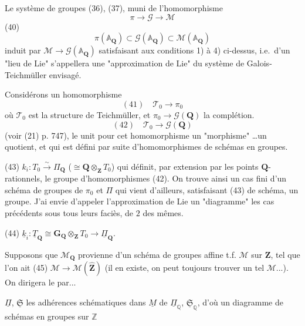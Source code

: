 \newpage


Le système de groupes (36), (37), muni de l'homomorphisme
$$
\pi \to \mathcal{G} \to \mathcal{M}
$$
(40) $$
\pi(\mathbb{A}_{\mathbf{Q}}) \subset \mathcal{G}(\mathbb{A}_{\mathbf{Q}}) \subset \mathcal{M}(\mathbb{A}_{\mathbf{Q}})
$$
induit par $\mathcal{M} \to \mathcal{G}(\mathbb{A}_{\mathbf{Q}})$ satisfaisant aux conditions 1) à 4) ci-dessus, i.e.\ d'un "lieu de Lie" s'appellera une "approximation de Lie" du système de Galois-Teichmüller envisagé.

Considérons un homomorphisme
$$
(41) \quad \mathcal{T}_0 \to \pi_0
$$
où $\mathcal{T}_0$ est la structure de Teichmüller, et $\pi_0 \to \mathcal{G}(\mathbf{Q})$ la complétion.
$$
(42) \quad \mathcal{T}_0 \to \mathcal{G}(\mathbf{Q})
$$
(voir (21) p. 747), le unit pour cet homomorphisme un "morphisme" \dots un quotient, et qui est défini par suite d'homomorphismes de schémas en groupes.

\newpage


(43) $k_i \colon T_0 \xrightarrow{\sim} \Pi_{\mathbf{Q}}$
($\cong \mathbf{Q} \otimes_{\mathbf{Z}} T_0$)
qui définit, par extension par les points $\mathbf{Q}$-rationnels, le groupe d'homomorphismes (42). On trouve ainsi un cas fini d'un schéma de groupes de $\pi_0$ et $\Pi$ qui vient d'ailleurs, satisfaisant (43) de schéma, un groupe. J'ai envie d'appeler l'approximation de Lie un "diagramme" les cas précédents sous tous leurs faciès, de $2$ des mêmes.

(44) $\underline{k}_i \colon \underline{T}_{\mathbf{Q}} \cong \mathbf{G}_{\mathbf{Q}} \otimes_{\mathbf{Z}} T_0 \to \underline{\Pi}_{\mathbf{Q}}$.

Supposons que $\mathcal{M}_{\mathbf{Q}}$ provienne d'un schéma de groupes affine t.f. $\mathcal{M}$ sur $\mathbf{Z}$, tel que l'on ait
(45) $\mathcal{M} \to \mathcal{M}(\hat{\mathbf{Z}})$
(il en existe, on peut toujours trouver un tel $\mathcal{M}$...). On dirigera le par...

\newpage


$\underline{\Pi}$, $\underline{\mathfrak{S}}$ les adhérences schématiques
dans $\underline{M}$ de $\underline{\Pi}_\mathbb{Q}$, $\underline{\mathfrak{S}}_\mathbb{Q}$, d'où un diagramme
de schémas en groupes sur $\mathbb{Z}$

